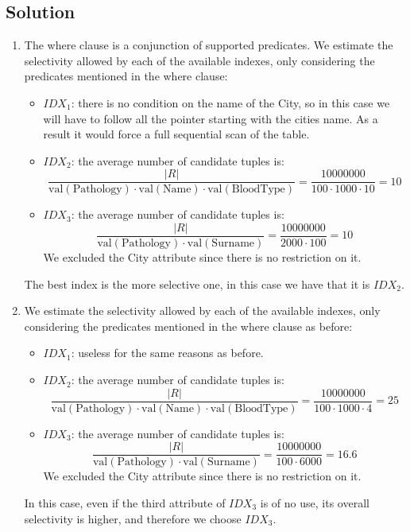 \subsection*{Solution}
\begin{enumerate}
    \item The where clause is a conjunction of supported predicates.
        We estimate the selectivity allowed by each of the available indexes, only considering the predicates mentioned in the where clause:
        \begin{itemize}
            \item $IDX_1$: there is no condition on the name of the City, so in this case we will have to follow all the pointer starting with the cities name. 
                As a result it would force a full sequential scan of the table.
            \item $IDX_2$: the average number of candidate tuples is: 
                \[\dfrac{\left\lvert R \right\rvert }{\text{val}(\text{Pathology}) \cdot \text{val}(\text{Name}) \cdot \text{val}(\text{BloodType})}=\dfrac{10000000}{100 \cdot 1000 \cdot 10}=10\]
            \item $IDX_3$: the average number of candidate tuples is: 
                \[\dfrac{\left\lvert R \right\rvert }{\text{val}(\text{Pathology}) \cdot \text{val}(\text{Surname}) }=\dfrac{10000000}{2000 \cdot 100}=10\]
                We excluded the City attribute since there is no restriction on it. 
        \end{itemize}
        The best index is the more selective one, in this case we have that it is $IDX_2$. 
    \item We estimate the selectivity allowed by each of the available indexes, only considering the predicates mentioned in the where clause as before:
        \begin{itemize}
            \item $IDX_1$: useless for the same reasons as before. 
            \item $IDX_2$: the average number of candidate tuples is: 
                \[\dfrac{\left\lvert R \right\rvert }{\text{val}(\text{Pathology}) \cdot \text{val}(\text{Name}) \cdot \text{val}(\text{BloodType})}=\dfrac{10000000}{100 \cdot 1000 \cdot 4}=25\]
            \item $IDX_3$: the average number of candidate tuples is: 
                \[\dfrac{\left\lvert R \right\rvert }{\text{val}(\text{Pathology}) \cdot \text{val}(\text{Surname}) }=\dfrac{10000000}{100 \cdot 6000}=16.6\]
                We excluded the City attribute since there is no restriction on it. 
        \end{itemize}
        In this case, even if the third attribute of $IDX_3$ is of no use, its overall selectivity is higher, and therefore we choose $IDX_3$.
\end{enumerate}